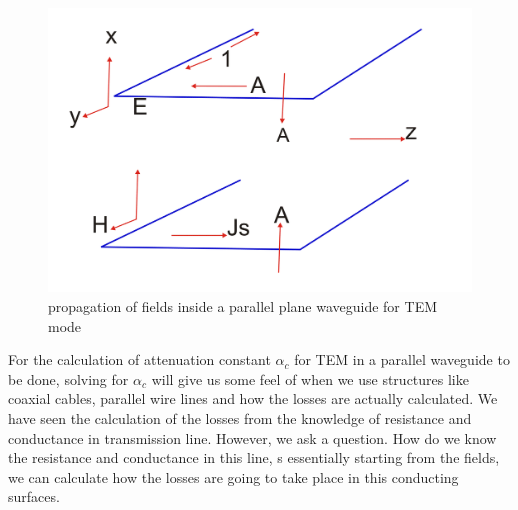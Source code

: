 \begin{figure}[h]
\centering
\includegraphics[scale=0.45]{./graphics/lecture2-image-b.png}
\caption{propagation of fields inside a parallel plane waveguide for TEM mode}
\end{figure}

For the calculation of  attenuation constant $\alpha_c$   for TEM in a parallel waveguide to be done, solving for $\alpha_c$  will give us some feel of when we use structures like coaxial cables, parallel wire lines and how the losses are actually calculated. We have seen the calculation of the losses from the knowledge of resistance and conductance in transmission line. However, we ask a question. How do we know the resistance and conductance in this line, s essentially starting from the fields, we can calculate how the losses are going to take place in this conducting surfaces.

